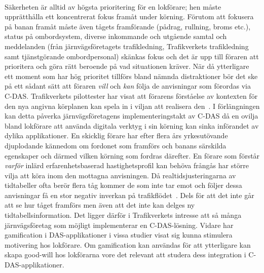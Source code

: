 \paragraph{}
\hspace{-11pt}Säkerheten är alltid av högsta prioritering för en lokförare; hen måste upprätthålla ett koncentrerat fokus framåt under körning.
Förutom att fokusera på banan framåt måste även tågets framförande (pådrag, rullning, broms etc.), status på ombordsystem, diverse inkommande och utgående samtal och meddelanden (från järnvägsföretagets trafikledning, Trafikverkets trafikledning samt tjänstgörande ombordpersonal) skänkas fokus och det är upp till föraren att prioritera och göra rätt beroende på vad situationen kräver.
När då ytterligare ett moment som har hög prioritet tillförs bland nämnda distraktioner bör det ske på ett sådant sätt att föraren \emph{vill} och \emph{kan} följa de anvisningar som förordas via C-DAS\@.
Trafikverkets pilottester har visat att förarens förståelse av kontexten för den nya angivna körplanen kan spela in i viljan att realisera den~\cite{Angel2020, Lindmark2022}.
I förlängningen kan detta påverka järnvägsföretagens implementeringstakt av C-DAS då en ovilja bland lokförare att använda digitala verktyg i sin körning kan sinka införandet av dylika applikationer\@.
En skicklig förare har efter flera års yrkesutövande djuplodande kännedom om fordonet som framförs och banans särskilda egenskaper och därmed vilken körning som fordras därefter.
En förare som förstår \emph{varför} inlärd erfarenhetsbaserad hastighetsprofil kan behöva frångås har större vilja att köra inom den mottagna anvisningen.
Då realtidsjusteringarna av tidtabeller ofta berör flera tåg kommer de som inte tar emot och följer dessa anvisningar få en stor negativ inverkan på trafikflödet~\cite{Joborn2023}.
Dels för att det inte går att se hur tåget framförs men även att det inte kan delges ny tidtabellsinformation.
Det ligger därför i Trafikverkets intresse att så många järnvägsföretag som möjligt implementerar en C-DAS-lösning.
Vidare har gamification i DAS-applikationer i vissa studier visat sig kunna stimulera motivering hos lokförare.
Om gamification kan användas för att ytterligare kan skapa good-will hos lokförarna vore det relevant att studera dess integration i C-DAS-applikationer.
